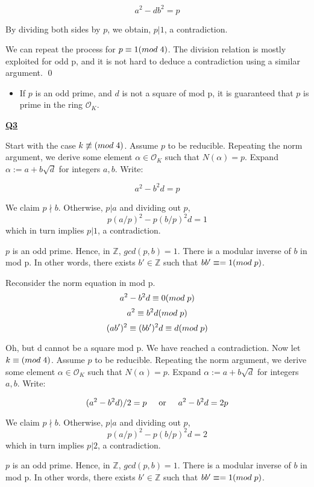 \documentclass{article}
\newcommand{\new}[1]{
    \vspace{2mm}
    \noindent
    \textbf{
    \underline{#1}}
}
\def\ZZ{{\mathbb{Z}}}
\def\_{{\hspace{1mm}}}
\def\contradiction{{\lightning}}
\newcommand{\textOr}{
    \hspace{5mm}
    \textrm{or}
    \hspace{5mm}
}
\newcommand{\<}{{
    \langle
}}
\def\ZZ{{\mathbb{Z}}}
\newcommand{\ringInt}{
    {\mathcal{O}}
}
\begin{document}
\[
a^2-db^2 = p
\]

By dividing both sides by $p$, we obtain, $p|1$, a contradiction. 
\contradiction

We can repeat the process for $p \equiv 1 (mod\_4)$. The 
division relation is mostly exploited for odd p, and it is not 
hard to deduce a contradiction using a similar argument. 
\qed

\newpage

\begin{itemize}
    \item If $p$ is an odd prime, and $d$ is not a square of 
    mod p, it is guaranteed that $p$ is prime in the ring 
    $\ringInt_K$. 
\end{itemize}


\new{Q3}
Start with the case $k \not\equiv (mod\_4)$. Assume $p$ to 
be reducible. Repeating the norm argument, we derive 
some element $\alpha \in \ringInt_K$ such that $N(\alpha) = p$. 
Expand $\alpha := a+b\sqrt{d}$ for integers $a, b$. Write:

\[
    a^2-b^2d = p
\]

We claim $p\nmid b$. Otherwise, $p|a$ and dividing out $p$, 
\[
    p(a/p)^2-p(b/p)^2d=1
\]
which in turn implies $p|1$, a contradiction. 

$p$ is an odd prime. Hence, in $\ZZ$, $gcd(p, b) = 1$. There 
is a modular inverse of $b$ in mod p. In other words, there exists 
$b' \in \ZZ$ such that $bb' \equiv = 1(mod \_ p)$. 

Reconsider the norm equation in mod p. 
\[
    a^2 - b^2d \equiv 0 (mod\_p)
\]
\[
    a^2 \equiv b^2d (mod\_p)
\]
\[
    (ab')^2 \equiv (bb')^2d \equiv d (mod\_p)
\]

Oh, but d cannot be a square mod p. We have reached a contradiction. 
\contradiction
Now let $k \equiv (mod\_4)$. Assume $p$ to 
be reducible. Repeating the norm argument, we derive 
some element $\alpha \in \ringInt_K$ such that $N(\alpha) = p$. 
Expand $\alpha := a+b\sqrt{d}$ for integers $a, b$. Write:

\[
    (a^2-b^2d)/2 = p 
    \textOr
a^2-b^2d = 2p 
\]

We claim $p\nmid b$. Otherwise, $p|a$ and dividing out $p$, 
\[
    p(a/p)^2-p(b/p)^2d=2
\]
which in turn implies $p|2$, a contradiction. 

$p$ is an odd prime. Hence, in $\ZZ$, $gcd(p, b) = 1$. There 
is a modular inverse of $b$ in mod p. In other words, there exists 
$b' \in \ZZ$ such that $bb' \equiv = 1(mod \_ p)$. 
\end{document}
